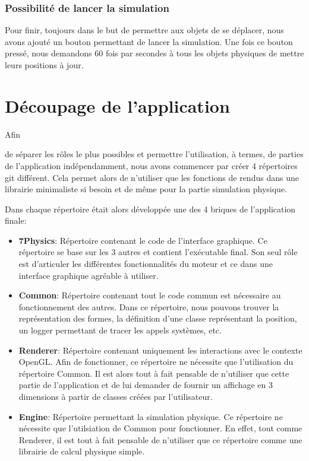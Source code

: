 \documentclass[11pt]{report}
\begin{document}
\subsection{Possibilité de lancer la simulation}

Pour finir, toujours dans le but de permettre aux objets de se déplacer, nous avons ajouté un bouton permettant de lancer la simulation.
Une fois ce bouton pressé, nous demandons 60 fois par secondes à tous les objets physiques de mettre leurs positions à jour.


\chapter{Découpage de l'application}

\hypertarget{découpage}{Afin} de séparer les rôles le plus possibles et permettre l'utilisation, à termes, de parties de l'application
indépendamment, nous avons commencer par créer 4 répertoires git différent. Cela permet alors de n'utiliser que
les fonctions de rendus dans une librairie minimaliste si besoin et de même pour la partie simulation physique.\newline

Dans chaque répertoire était alors développée une des 4 briques de l'application finale:\newline

\begin{itemize}
  \item \textbf{7Physics}: Répertoire contenant le code de l'interface graphique. Ce répertoire se base sur les 3 autres
        et contient l'exécutable final. Son seul rôle est d'articuler les différentes fonctionnalités du moteur et ce
        dans une interface graphique agréable à utiliser.\newline
  \item\textbf{Common}: Répertoire contenant tout le code commun est nécessaire au fonctionnement des autres. Dans ce
        répertoire, nous pouvons trouver la représentation des formes, la définition d'une classe représentant la position,
        un logger permettant de tracer les appels systèmes, etc.\newline
  \item \textbf{Renderer}: Répertoire contenant uniquement les interactions avec le contexte OpenGL. Afin de fonctionner,
        ce répertoire ne nécessite que l'utilisation du répertoire Common. Il est alors tout à fait pensable de n'utiliser
        que cette partie de l'application et de lui demander de fournir un affichage en 3 dimensions à partir de classes
        créées par l'utilisateur.\newline
  \item \textbf{Engine}: Répertoire permettant la simulation physique. Ce répertoire ne nécessite que l'utilsiation
        de Common pour fonctionner. En effet, tout comme Renderer, il est tout à fait pensable de n'utiliser que ce répertoire
        comme une librairie de calcul physique simple.\newline
\end{itemize}
\end{document}
